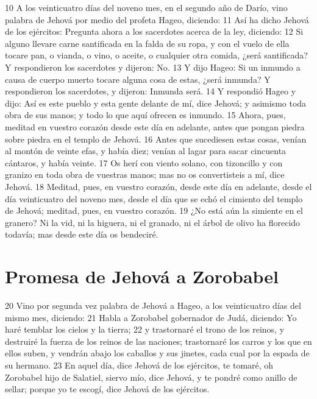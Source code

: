 10 A los veinticuatro días del noveno mes, en el segundo año de Darío, vino palabra de Jehová por medio del profeta Hageo, diciendo:
11 Así ha dicho Jehová de los ejércitos: Pregunta ahora a los sacerdotes acerca de la ley, diciendo:
12 Si alguno llevare carne santificada en la falda de su ropa, y con el vuelo de ella tocare pan, o vianda, o vino, o aceite, o cualquier otra comida, ¿será santificada? Y respondieron los sacerdotes y dijeron: No.
13 Y dijo Hageo: Si un inmundo a causa de cuerpo muerto tocare alguna cosa de estas, ¿será inmunda? Y respondieron los sacerdotes, y dijeron: Inmunda será.
14 Y respondió Hageo y dijo: Así es este pueblo y esta gente delante de mí, dice Jehová; y asimismo toda obra de sus manos; y todo lo que aquí ofrecen es inmundo.
15 Ahora, pues, meditad en vuestro corazón desde este día en adelante, antes que pongan piedra sobre piedra en el templo de Jehová. 
16 Antes que sucediesen estas cosas, venían al montón de veinte efas,  y había diez; venían al lagar para sacar cincuenta cántaros, y había veinte.
17 Os herí con viento solano, con tizoncillo y con granizo en toda obra de vuestras manos; mas no os convertisteis a mí, dice Jehová.
18 Meditad, pues, en vuestro corazón, desde este día en adelante, desde el día veinticuatro del noveno mes, desde el día que se echó el cimiento del templo de Jehová; meditad, pues, en vuestro corazón.
19 ¿No está aún la simiente en el granero? Ni la vid, ni la higuera, ni el granado, ni el árbol de olivo ha florecido todavía; mas desde este día os bendeciré.

\section*{Promesa de Jehová a Zorobabel}

20 Vino por segunda vez palabra de Jehová a Hageo, a los veinticuatro días del mismo mes, diciendo:
21 Habla a Zorobabel gobernador de Judá, diciendo: Yo haré temblar los cielos y la tierra;
22 y trastornaré el trono de los reinos, y destruiré la fuerza de los reinos de las naciones; trastornaré los carros y los que en ellos suben, y vendrán abajo los caballos y sus jinetes, cada cual por la espada de su hermano.
23 En aquel día, dice Jehová de los ejércitos, te tomaré, oh Zorobabel hijo de Salatiel, siervo mío, dice Jehová, y te pondré como anillo de sellar; porque yo te escogí, dice Jehová de los ejércitos.

